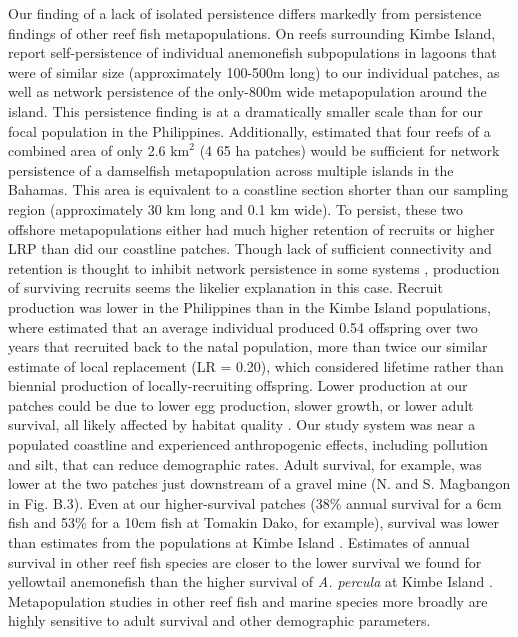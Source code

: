 \documentclass[12pt, oneside]{article}   	%
\begin{document}
Our finding of a lack of isolated persistence differs markedly from persistence findings of other reef fish metapopulations. On reefs surrounding Kimbe Island, \cite{salles_coral_2015} report self-persistence of individual anemonefish subpopulations in lagoons that were of similar size (approximately 100-500m long) to our individual patches, as well as network persistence of the only-800m wide metapopulation around the island. This persistence finding is at a dramatically smaller scale than for our focal population in the Philippines. Additionally, \cite{johnson2018integrating} estimated that four reefs of a combined area of only 2.6 $\text{km}^2$ (4 65 ha patches) would be sufficient for network persistence of a damselfish metapopulation across multiple islands in the Bahamas. This area is equivalent to a coastline section shorter than our sampling region (approximately 30 km long and 0.1 km wide). To persist, these two offshore metapopulations either had much higher retention of recruits or higher LRP than did our coastline patches. Though lack of sufficient connectivity and retention is thought to inhibit network persistence in some systems \citep[e.g., insufficient retention of offspring within reserves for eastern oysters (\textit{Crassostrea virginica}) in North Carolina;][]{puckett2016metapopulation}, production of surviving recruits seems the likelier explanation in this case. Recruit production was lower in the Philippines than in the Kimbe Island populations, where \cite{salles2020strong} estimated that an average individual produced 0.54 offspring over two years that recruited back to the natal population, more than twice our similar estimate of local replacement (LR = 0.20), which considered lifetime rather than biennial production of locally-recruiting offspring. Lower production at our patches could be due to lower egg production, slower growth, or lower adult survival, all likely affected by habitat quality \citep[e.g.][]{salles2020strong, hayashi2019low}. Our study system was near a populated coastline and experienced anthropogenic effects, including pollution and silt, that can reduce demographic rates. Adult survival, for example, was lower at the two patches just downstream of a gravel mine (N. and S. Magbangon in Fig. B.3). Even at our higher-survival patches (38\% annual survival for a 6cm fish and 53\% for a 10cm fish at Tomakin Dako, for example), survival was lower than estimates from the populations at Kimbe Island \citep[85\% annual survival,][]{salles_coral_2015}. Estimates of annual survival in other reef fish species are closer to the lower survival we found for yellowtail anemonefish than the higher survival of \textit{A. percula} at Kimbe Island \citep[approximately 30\% annual survival for bluehead wrasse (\textit{Thalassoma bifasciatum}) and bicolour damselfish (\textit{Stegastes partitus}), respectively;][]{warner1988population, figueira2008small}. Metapopulation studies in other reef fish \citep[e.g.,][]{figueira2009connectivity} and marine species more broadly \citep{carson2011evaluating} are highly sensitive to adult survival and other demographic parameters.
\end{document}
